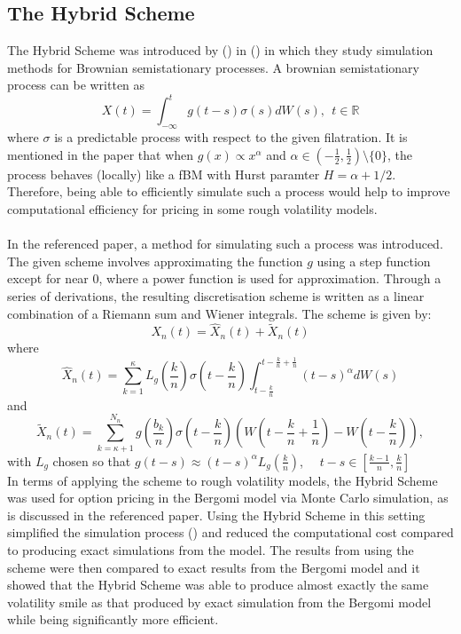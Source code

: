 \documentclass[12pt,oneside]{article}
\begin{document}
\subsection{The Hybrid Scheme}
\label{subsec:hybrid_scheme}
The Hybrid Scheme was introduced by (\cite{BENNEDSON}) in (\cite{PAPER}) in which they study simulation methods for Brownian semistationary processes. A brownian semistationary process can be written as $$X(t)=\int_{-\infty}^t g(t-s) \sigma(s) dW(s),  \ \  t\in\mathbb{R}$$ where $\sigma$ is a predictable process with respect to the given filatration. It is mentioned in the paper that when $g(x) \propto x^\alpha$ and $\alpha \in (-\frac{1}{2}, \frac{1}{2}) \setminus \{0\}$, the process behaves (locally) like a fBM with Hurst paramter $H=\alpha+1/2$.  Therefore, being able to efficiently simulate such a process would help to improve computational efficiency for pricing in some rough volatility models.  
\\
\\
In the referenced paper, a method for simulating such a process was introduced. The given scheme involves approximating the function $g$ using a step function except for near 0, where a power function is used for approximation. Through a series of derivations,  the resulting discretisation scheme is written as a linear combination of a Riemann sum and Wiener integrals. The scheme is given by: $$X_n(t) = \hat{X}_n(t) + \tilde{X}_n(t)$$ where $$\hat{X}_n(t) = \sum_{k=1}^{\kappa} L_g(\frac{k}{n}) \sigma (t-\frac{k}{n}) \int_{t-\frac{k}{n}}^{t-\frac{k}{n}+\frac{1}{n}}(t-s)^\alpha dW(s)$$ and $$\tilde{X}_n(t) = \sum_{k=\kappa+1}^{N_n}g(\frac{b_k}{n})\sigma(t-\frac{k}{n})(W(t-\frac{k}{n}+\frac{1}{n})-W(t-\frac{k}{n})),$$ with $L_g$ chosen so that $g(t-s) \approx (t-s)^\alpha L_g(\frac{k}{n})$, \ \ $t-s \in [\frac{k-1}{n},\frac{k}{n}]$
\\
In terms of applying the scheme to rough volatility models, the Hybrid Scheme was used for option pricing in the Bergomi model via Monte Carlo simulation, as is discussed in the referenced paper. Using the Hybrid Scheme in this setting simplified the simulation process (\cite{see page 20 of BENNEDSON}) and reduced the computational cost compared to producing exact simulations from the model.  The results from using the scheme were then compared to exact results from the Bergomi model and it showed that the Hybrid Scheme was able to produce almost exactly the same volatility smile as that produced by exact simulation from the Bergomi model while being significantly more efficient.
\end{document}
